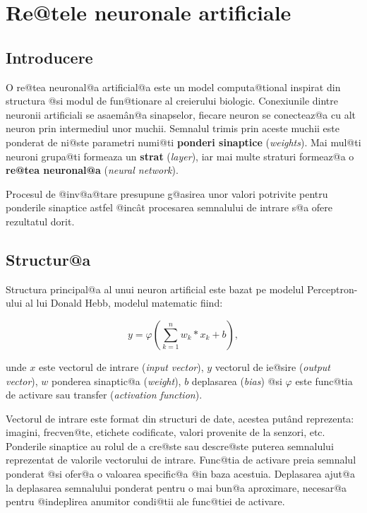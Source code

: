 	

\chapter{Re@tele neuronale artificiale}


\section{Introducere}


O re@tea neuronal@a artificial@a este un model computa@tional inspirat din structura @si modul de fun@tionare al creierului biologic. Conexiunile dintre neuronii artificiali se asaem\^ an@a sinapselor, fiecare neuron se conecteaz@a cu alt neuron prin intermediul unor muchii. Semnalul trimis prin aceste muchii este ponderat de ni@ste parametri numi@ti \textbf{ponderi sinaptice} (\textsl{weights}). Mai mul@ti neuroni grupa@ti formeaza un \textbf{strat} (\textsl{layer}), iar mai multe straturi formeaz@a o \textbf{re@tea neuronal@a} (\textsl{neural network}).

Procesul de @inv@a@tare presupune g@asirea unor valori potrivite pentru ponderile sinaptice astfel @inc\^ at procesarea semnalului de intrare s@a ofere rezultatul dorit.


\section{Structur@a}

Structura principal@a al unui neuron artificial este bazat pe modelul Perceptron-ului al lui Donald Hebb, modelul matematic fiind:

$$
	y = \varphi \left( \sum_{k=1}^{n} w_k * x_k + b \right),
$$

\indent unde $x$ este vectorul de intrare ({\sl input vector}), $y$ vectorul de ie@sire ({\sl output vector}), $w$ ponderea sinaptic@a ({\sl weight}), $b$ deplasarea ({\sl bias}) @si $\varphi$ este func@tia de activare sau transfer ({\sl activation function}).

Vectorul de intrare este format din structuri de date, acestea put\^ and reprezenta: imagini, frecven@te, etichete codificate, valori provenite de la senzori, etc. Ponderile sinaptice au rolul de a cre@ste sau descre@ste puterea semnalului reprezentat de valorile vectorului de intrare. Func@tia de activare preia semnalul ponderat @si ofer@a o valoarea specific@a @in baza acestuia. Deplasarea ajut@a la deplasarea semnalului ponderat pentru o mai bun@a aproximare, necesar@a pentru @indeplirea anumitor condi@tii ale func@tiei de activare.

